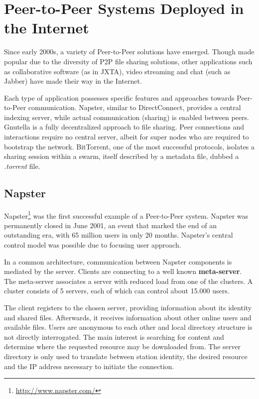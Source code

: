 \section{Peer-to-Peer Systems Deployed in the Internet}
\label{sec:p2p-systems:p2p-internet}

Since early 2000s, a variety of
Peer-to-Peer solutions have emerged. Though made popular due to the diversity
of P2P file sharing solutions, other applications such as collaborative
software (as in JXTA), video streaming and chat (such as Jabber) have made
their way in the Internet.

Each type of application possesses specific features and approaches towards
Peer-to-Peer communication. Napster, similar to DirectConnect, provides a
central indexing server, while actual communication (sharing) is enabled
between peers. Gnutella is a fully decentralized approach to file sharing.
Peer connections and interactions require no central server, albeit for super
nodes who are required to bootstrap the network. BitTorrent, one of the most
successful protocols, isolates a sharing session within a swarm, itself
described by a metadata file, dubbed a \textit{.torrent} file.

\subsection{Napster}

Napster\footnote{\url{http://www.napster.com/}} was the first successful example of a Peer-to-Peer
system. Napster was permanently closed in June 2001, an event that marked the
end of an outstanding era, with 65 million users in only 20 months. Napster's
central control model was possible due to focusing user approach.

In a common architecture, communication between Napster components is mediated
by the server. Clients are connecting to a well known \textbf{meta-server}.
The meta-server associates a server with reduced load from one of the
clusters. A cluster consists of 5 servers, each of which can control about
15.000 users.

The client registers to the chosen server, providing information about its
identity and shared files. Afterwards, it receives information about other
online users and available files. Users are anonymous to each other and local
directory structure is not directly interrogated. The main interest is
searching for content and determine where the requested resource may be
downloaded from.  The server directory is only used to translate between
station identity, the desired resource and the IP address necessary to
initiate the connection.

